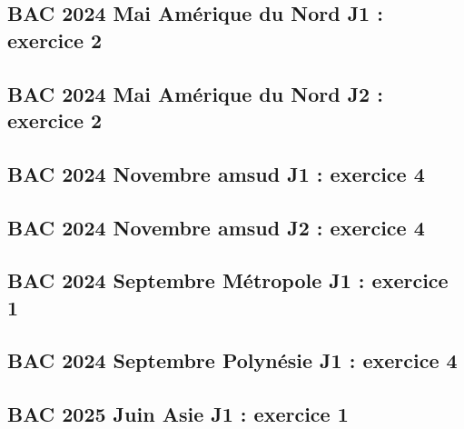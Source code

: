 \documentclass[lang=fr,edition=teacher,layout=sheet]{mxbook}
\begin{document}
\begingroup\endgroup
\par\bigskip
{}\subsection*{BAC 2024 Mai Amérique du Nord J1 : exercice 2}
\begingroup\endgroup
\par\bigskip
{}\subsection*{BAC 2024 Mai Amérique du Nord J2 : exercice 2}
\begingroup\endgroup
\par\bigskip
{}\subsection*{BAC 2024 Novembre amsud J1 : exercice 4}
\begingroup\endgroup
\par\bigskip
{}\subsection*{BAC 2024 Novembre amsud J2 : exercice 4}
\begingroup\endgroup
\par\bigskip
{}\subsection*{BAC 2024 Septembre Métropole J1 : exercice 1}
\begingroup\endgroup
\par\bigskip
{}\subsection*{BAC 2024 Septembre Polynésie J1 : exercice 4}
\begingroup\endgroup
\par\bigskip
{}\subsection*{BAC 2025 Juin Asie J1 : exercice 1}
\end{document}
